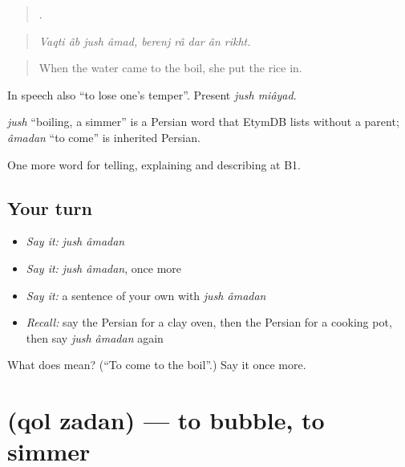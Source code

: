 \begin{quote}
        .
\end{quote}

\begin{quote}
\emph{Vaqti âb jush âmad, berenj râ dar ân rikht.}
\end{quote}

\begin{quote}
When the water came to the boil, she put the rice in.
\end{quote}

In speech also \textquotedblleft{}to lose one's temper\textquotedblright{}. Present \emph{jush miâyad}.

\begin{cousinweb}
\emph{jush} \textquotedblleft{}boiling, a simmer\textquotedblright{} is a Persian word that EtymDB lists without a parent; \emph{âmadan} \textquotedblleft{}to come\textquotedblright{} is inherited Persian.
\end{cousinweb}

\begin{grammarlens}[title={What you've built}]
One more word for telling, explaining and describing at B1.
\end{grammarlens}

\subsection*{Your turn}
\begin{itemize}
\raggedright
  \item \emph{Say it:} \emph{jush âmadan}
  \item \emph{Say it:} \emph{jush âmadan}, once more
  \item \emph{Say it:} a sentence of your own with \emph{jush âmadan}
  \item \emph{Recall:} say the Persian for a clay oven, then the Persian for a cooking pot, then say \emph{jush âmadan} again
\end{itemize}

\begin{tcolorbox}[breakable,colback=teal!4,colframe=teal!35!black,title={Before you move on}]
What does   mean? (\textquotedblleft{}To come to the boil\textquotedblright{}.) Say it once more.
\end{tcolorbox}
\section[\texorpdfstring{\fa{قل} \fa{زدن} (qol zadan)}{قل زدن (qol zadan)}]{  (qol zadan) — to bubble, to simmer}

